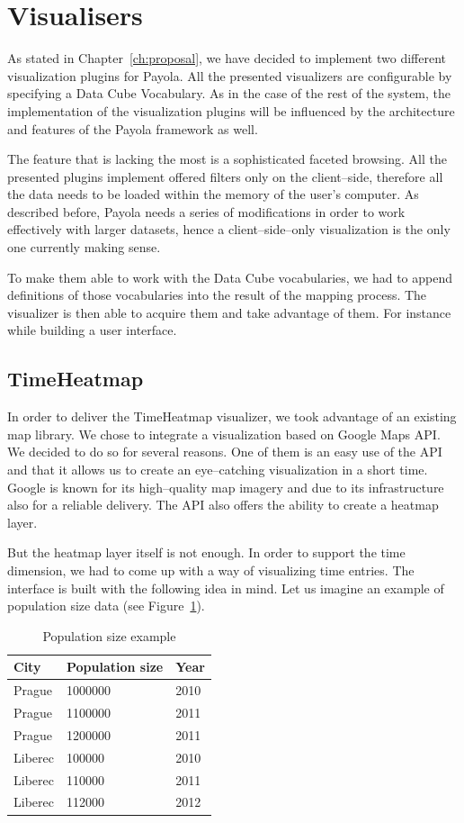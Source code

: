 \section{Visualisers}
As stated in Chapter~\ref{ch:proposal}, we have decided to implement two 
different visualization plugins for Payola. All the presented 
visualizers are configurable by specifying a Data Cube Vocabulary.
As in the case of the rest of the 
system, the implementation of the visualization plugins will be influenced 
by the architecture and features of the Payola framework as well.

The feature that is lacking the most  is a sophisticated faceted browsing. All the presented plugins 
implement offered filters only on the client--side, therefore all the data needs 
to be loaded within the memory of the user’s computer. As described before, Payola 
needs a series of modifications in order to work effectively with larger 
datasets, hence a client--side--only visualization is the only one currently making sense.

To make them able to work with the Data Cube vocabularies, we had to append 
definitions of those vocabularies into the result of the mapping process. The 
visualizer is then able to acquire them and take advantage of them. For instance 
while building a user interface.

\subsection{TimeHeatmap}
In order to deliver the TimeHeatmap visualizer, we took advantage of an existing 
map library. We chose to integrate a visualization based on Google Maps API. We 
decided to do so for several reasons. One of them is an easy use of the API and that it allows us to
create an eye--catching visualization in a short 
time. Google is known for its high--quality map imagery and due to its 
infrastructure also for a reliable delivery. The API also offers the ability to create a heatmap layer.

But the heatmap layer itself is not enough. In order to support the time 
dimension, we had to come up with a way of visualizing time entries. The 
interface is built with the following idea in mind. Let us imagine an example of 
population size data (see Figure~\ref{fig:impl-pop-ex}).

\begin{table}
  \begin{center}
\begin{tabular}{l|l|l}
  City & Population size & Year \\ \hline
  Prague   &    1000000   &   2010 \\
  Prague   &    1100000   &   2011 \\
  Prague   &    1200000   &   2011 \\
  Liberec   &    100000    &  2010 \\
  Liberec   &    110000    &  2011 \\
  Liberec    &   112000    &  2012
\end{tabular}
\caption{Population size example}
\label{fig:impl-pop-ex}
  \end{center}
\end{table}


